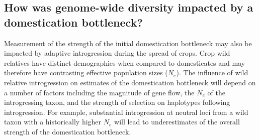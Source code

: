 \documentclass[11pt]{article}
\begin{document}
\subsection*{How was genome-wide diversity impacted by a domestication bottleneck?}
Measurement of the strength of the initial domestication bottleneck may also be impacted by adaptive introgression during the spread of crops.
Crop wild relatives have distinct demographies when compared to domesticates and may therefore have contrasting effective population sizes ($N_e$).
The influence of wild relative introgression on estimates of the domestication bottleneck will depend on a number of factors including the magnitude of gene flow, the $N_e$ of the introgressing taxon, and the strength of selection on haplotypes following introgression.
For example, substantial introgression at neutral loci from a wild taxon with a historically higher $N_e$ will lead to underestimates of the overall strength of the domestication bottleneck.
\end{document}
